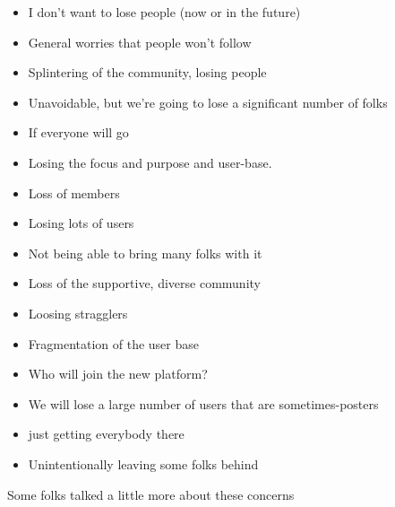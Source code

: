 \documentclass[
]{book}
\providecommand{\tightlist}{%
  \setlength{\itemsep}{0pt}\setlength{\parskip}{0pt}}
\begin{document}
\begin{itemize}
\tightlist
\item
  I don't want to lose people (now or in the future)
\item
  General worries that people won't follow
\item
  Splintering of the community, losing people
\item
  Unavoidable, but we're going to lose a significant number of folks
\item
  If everyone will go
\item
  Losing the focus and purpose and user-base.
\item
  Loss of members
\item
  Losing lots of users
\item
  Not being able to bring many folks with it
\item
  Loss of the supportive, diverse community
\item
  Loosing stragglers
\item
  Fragmentation of the user base
\item
  Who will join the new platform?
\item
  We will lose a large number of users that are sometimes-posters
\item
  just getting everybody there
\item
  Unintentionally leaving some folks behind
\end{itemize}

Some folks talked a little more about these concerns
\end{document}
